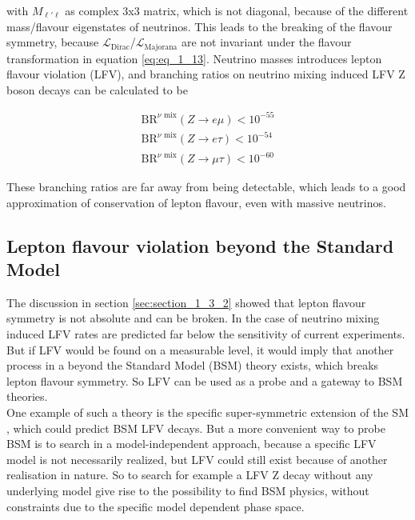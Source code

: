 with $M_{\ell'\ell}$ as complex 3x3 matrix, which is not diagonal, because of the different mass/flavour eigenstates of neutrinos. This leads to the breaking of the flavour symmetry, because $\mathcal{L}_{\text{Dirac}}$/$\mathcal{L}_{\text{Majorana}}$ are not invariant under the flavour transformation in equation \ref{eq:eq_1_13}. Neutrino masses introduces lepton flavour violation (\gls{LFV}), and branching ratios on neutrino mixing induced \gls{LFV} Z boson decays \cite{NEUTRINOLFV} can be calculated to be 

\begin{equation}
	\label{eq:eq_1_16}
	\begin{split}
		\text{BR}^{\nu \text{ mix}}(Z\to e\mu) < 10^{-55} \\
		\text{BR}^{\nu \text{ mix}}(Z\to e\tau) < 10^{-54} \\
		\text{BR}^{\nu \text{ mix}}(Z\to \mu\tau) < 10^{-60}
	\end{split}
\end{equation}

These branching ratios are far away from being detectable, which leads to a good approximation of conservation of lepton flavour, even with massive neutrinos.

\subsection{Lepton flavour violation beyond the Standard Model}
\label{sec:section_1_3_3}

The discussion in section \ref{sec:section_1_3_2} showed that lepton flavour symmetry is not absolute and can be broken. In the case of neutrino mixing induced \gls{LFV} rates are predicted far below the sensitivity of current experiments. But if \gls{LFV} would be found on a measurable level, it would imply that another process in a beyond the Standard Model (\gls{BSM}) theory exists, which breaks lepton flavour symmetry. So \gls{LFV} can be used as a probe and a gateway to \gls{BSM} theories. \\

One example of such a theory is the specific super-symmetric extension of the \gls{SM} \cite{SUSYLFV}, which could predict \gls{BSM} \gls{LFV} decays. But a more convenient way to probe \gls{BSM} is to search in a model-independent approach, because a specific \gls{LFV} model is not necessarily realized, but \gls{LFV} could still exist because of another realisation in nature. So to search for example a \gls{LFV} Z decay without any underlying model give rise to the possibility to find \gls{BSM} physics, without constraints due to the specific model dependent phase space. \\

